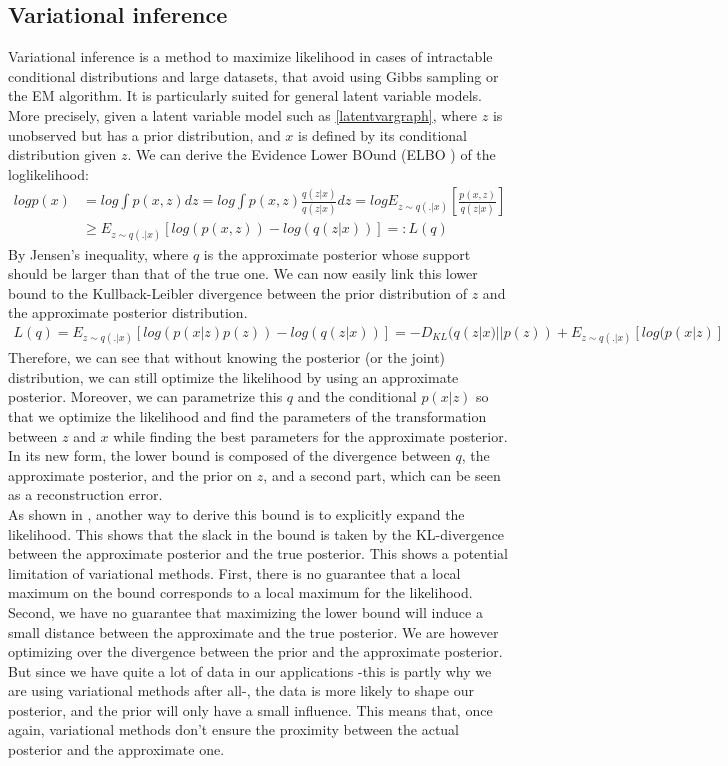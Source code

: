 \documentclass[letterpaper, twoside]{article}
\begin{document}
  \subsection{Variational inference}
    Variational inference is a method to maximize likelihood in cases of intractable conditional distributions and large datasets, that avoid using Gibbs sampling or the EM algorithm. It is particularly suited for general latent variable models. More precisely, given a latent variable model such as \ref{latentvargraph}, where $z$ is unobserved but has a prior distribution, and $x$ is defined by its conditional distribution given $z$.
     We can derive the Evidence Lower BOund (ELBO \cite{Jordan:VarMethods}) of the loglikelihood:\\
    \begin{align}
    log p(x) & = log \int p(x, z)dz = log \int p(x, z) \frac{q(z|x)}{q(z|x)} dz = log E_{z\sim q(.|x)}[\frac{p(x, z)}{q(z|x)}] \\
             & \geq E_{z\sim q(.|x)}[log(p(x, z)) - log (q(z|x))] =: L(q)
    \end{align}
    By Jensen's inequality, where $q$ is the approximate posterior whose support should be larger than that of the true one.
    We can now easily link this lower bound to the Kullback-Leibler divergence between the prior distribution of $z$ and the approximate posterior distribution.
    \begin{align}
    L(q) = E_{z\sim q(.|x)}[log(p(x| z)p(z)) - log (q(z|x))] = -D_{KL} (q(z|x)||p(z)) + E_{z\sim q(.|x)}[log(p(x| z)]
    \end{align}
    Therefore, we can see that without knowing the posterior (or the joint) distribution, we can still optimize the likelihood by using an approximate posterior. Moreover, we can parametrize this $q$ and the conditional $p(x|z)$ so that we optimize the likelihood and find the parameters of the transformation between $z$ and $x$ while finding the best parameters for the approximate posterior. In its new form, the lower bound is composed of the divergence between $q$, the approximate posterior, and the prior on $z$, and a second part, which can be seen as a reconstruction error.\\

    As shown in \cite{Kingma.aevb}, another way to derive this bound is to explicitly expand the likelihood. This shows that the slack in the bound is taken by the KL-divergence between the approximate posterior and the true posterior. This shows a potential limitation of variational methods. First, there is no guarantee that a local maximum on the bound corresponds to a local maximum for the likelihood. Second, we have no guarantee that maximizing the lower bound will induce a small distance between the approximate and the true posterior. We are however optimizing over the divergence between the prior and the approximate posterior. But since we have quite a lot of data in our applications -this is partly why we are using variational methods after all-, the data is more likely to shape our posterior, and the prior will only have a small influence. This means that, once again, variational methods don't ensure the proximity between the actual posterior and the approximate one.
\end{document}
